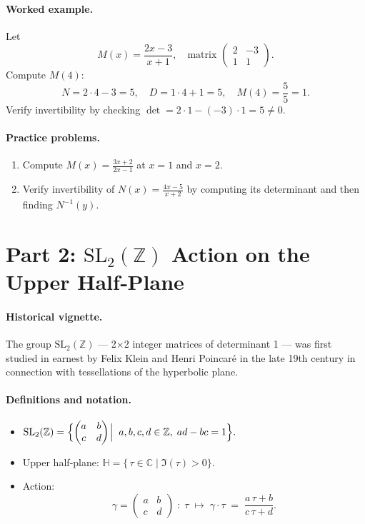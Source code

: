 \documentclass[11pt]{article}
\begin{document}
\paragraph{Worked example.}
Let
\[
M(x) = \frac{2x - 3}{x + 1}, 
\quad\text{matrix }
\begin{pmatrix}2 & -3\\[6pt]1 & 1\end{pmatrix}.
\]
Compute \(M(4)\):
\[
N = 2\cdot4 - 3 = 5,\quad D = 1\cdot4 + 1 = 5,
\quad M(4) = \frac{5}{5} = 1.
\]
Verify invertibility by checking \(\det = 2\cdot1 - (-3)\cdot1 = 5\neq0\).

\paragraph{Practice problems.}
\begin{enumerate}
  \item Compute \(M(x)=\frac{3x+2}{2x-1}\) at \(x=1\) and \(x=2\).  
  \item Verify invertibility of \(N(x)=\tfrac{4x-5}{x+2}\) by computing its determinant and then finding \(N^{-1}(y)\).
\end{enumerate}

\newpage
\section*{Part 2: \(\mathrm{SL}_2(\mathbb{Z})\) Action on the Upper Half‐Plane}

\paragraph{Historical vignette.}
The group \(\mathrm{SL}_2(\mathbb{Z})\) — 2×2 integer matrices of determinant 1 — was first studied in earnest by Felix Klein and Henri Poincaré in the late 19th century in connection with tessellations of the hyperbolic plane.

\paragraph{Definitions and notation.}
\begin{itemize}
  \item \(\displaystyle \mathrm{SL}_2(\mathbb{Z})
    = \Bigl\{\begin{pmatrix}a&b\\c&d\end{pmatrix}\!
      \Bigm|\;a,b,c,d\in\mathbb{Z},\;ad-bc=1\Bigr\}.\)
  \item Upper half‐plane:
    \(\displaystyle \mathbb{H} = \{\,\tau\in\mathbb{C}\mid \Im(\tau)>0\}.\)
  \item Action:
    \[
      \gamma = \begin{pmatrix}a & b\\ c & d\end{pmatrix}
      \;:\;\tau \;\longmapsto\;
      \gamma\cdot\tau \;=\;
      \frac{a\,\tau + b}{c\,\tau + d}.
    \]
\end{itemize}
\end{document}
